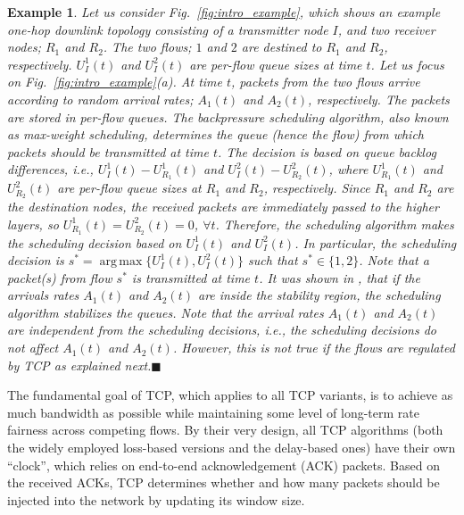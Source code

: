 \documentclass[conference]{IEEEtran}
\newcommand{\ie}{{\em i.e., }}
\newtheorem{example}{Example}
\DeclareMathOperator*{\argmax}{arg\,max}
\begin{document}
\begin{example}\label{ex1}
Let us consider Fig.~\ref{fig:intro_example}, which shows an example one-hop downlink topology consisting of a transmitter node $I$, and two receiver nodes; $R_1$ and $R_2$. The two flows; $1$ and $2$ are destined to $R_1$ and $R_2$, respectively. $U_{I}^{1}(t)$ and $U_{I}^{2}(t)$ are per-flow queue sizes at time $t$. Let us focus on Fig.~\ref{fig:intro_example}(a). At time $t$, packets from the two flows arrive according to random arrival rates; $A_1(t)$ and $A_2(t)$, respectively. The packets are stored in per-flow queues.
The backpressure scheduling algorithm, also known as max-weight scheduling, determines the queue (hence the flow) from which packets should be transmitted at time $t$. The decision is based on queue backlog differences, \ie $U_{I}^{1}(t) - U_{R_1}^{1}(t)$ and $U_{I}^{2}(t) - U_{R_2}^{2}(t)$, where $U_{R_1}^{1}(t)$ and $U_{R_2}^{2}(t)$ are per-flow queue sizes at $R_1$ and $R_2$, respectively. Since $R_1$ and $R_2$ are the destination nodes, the received packets are immediately passed to the higher layers, so $U_{R_1}^{1}(t) = U_{R_2}^{2}(t) = 0$, $\forall t$. Therefore, the scheduling algorithm makes the scheduling decision based on $U_{I}^{1}(t)$ and $U_{I}^{2}(t)$. In particular, the scheduling decision is $s^{*} = \argmax \{U_{I}^{1}(t),U_{I}^{2}(t)\}$ such that $s^{*} \in \{1,2\}$. Note that a packet(s) from flow $s^{*}$ is transmitted at time $t$. It was shown in \cite{tass_eph1}, \cite{tass_eph2} that if the arrivals rates $A_1(t)$ and $A_2(t)$ are inside the stability region, the scheduling algorithm stabilizes the queues. Note that the arrival rates $A_1(t)$ and $A_2(t)$ are independent from the scheduling decisions, \ie the scheduling decisions do not affect $A_1(t)$ and $A_2(t)$. However, this is not true if the flows are regulated by TCP as explained next.\hfill $\blacksquare$
\end{example}

The fundamental goal of TCP, which applies to all TCP variants, is to achieve as much bandwidth as possible while maintaining some level of long-term rate fairness across competing flows. By their very design, all TCP algorithms (both the widely employed loss-based versions and the delay-based ones) have their own ``clock'', which relies on end-to-end acknowledgement (ACK) packets. Based on the received ACKs, TCP determines whether and how many packets should be injected into the network by updating its window size.
\end{document}
